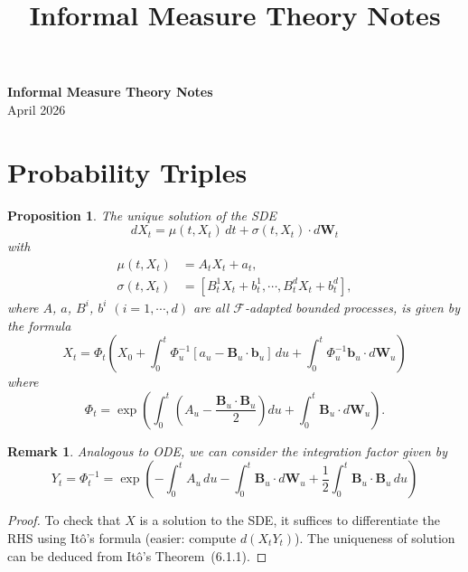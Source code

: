 \documentclass[a4paper, 11pt]{article}
\date{}
\title{Informal Measure Theory Notes}
\theoremstyle{italicbody}
\newtheorem{proposition}{Proposition}[subsection]
\theoremstyle{uprightbody}
\newtheorem{remark}{Remark}[subsection]
\newcommand{\F}{\mathcal{F}}
\begin{document}
\pagestyle{fancy}
\begin{center}
{\bfseries \large Informal Measure Theory Notes} \\[0.5em]
April 2026
\end{center}
\tableofcontents
\newpage
\section{Probability Triples}
\label{sec:org827354a}

\begin{proposition}
The unique solution of the SDE
\[
dX_t = \mu(t, X_t) \, dt + \sigma(t, X_t) \cdot d\bm{W}_t
\]
with
\begin{align*}
\mu(t, X_t) &= A_t X_t + a_t, \\
\sigma(t, X_t) &= [B_t^1 X_t + b_t^1, \cdots, B_t^d X_t + b_t^d],
\end{align*}
where $A$, $a$, $B^i$, $b^i$ $(i = 1, \cdots, d)$ are all $\F$-adapted bounded processes, is given by the formula
\[
X_t = \Phi_t \left(X_0 + \int_0^t \Phi_u^{-1} [a_u - \bm{B}_u \cdot \bm{b}_u] \, du + \int_0^t \Phi_u^{-1} \bm{b}_u \cdot d\bm{W}_u\right)
\]
where
\[
\Phi_t = \exp\left(\int_0^t \left(A_u - \frac{\bm{B}_u \cdot \bm{B}_u}{2}\right) du + \int_0^t \bm{B}_u \cdot d\bm{W}_u\right).
\]
\end{proposition}

\begin{remark}
Analogous to ODE, we can consider the integration factor given by
\[
Y_t = \Phi_t^{-1} = \exp\left(-\int_0^t A_u \, du - \int_0^t \bm{B}_u \cdot d\bm{W}_u + \frac{1}{2} \int_0^t \bm{B}_u \cdot \bm{B}_u \, du\right)
\]
\end{remark}

\begin{proof}
To check that $X$ is a solution to the SDE, it suffices to differentiate the RHS using It\^o's formula (easier: compute $d(X_t Y_t)$). The uniqueness of solution can be deduced from It\^o's Theorem~(6.1.1).
\end{proof}
\end{document}
